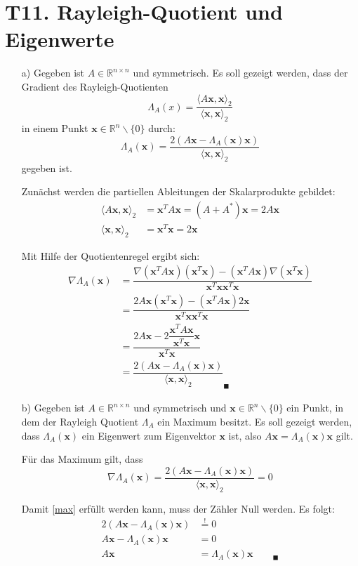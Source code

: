 \documentclass[11pt]{article}
\theoremstyle{plain}
\theoremstyle{definition}
\let\mbb\boldsymbol
\renewcommand\boldsymbol{\mbb}
\renewcommand{\a}{\"{a}}
\renewcommand{\u}{\"{u}}
\newcommand{\beequal}{\mathop{=}\limits^!}
\newcommand{\ray}{\Lambda_A(\mbb{x})}
\newcommand{\dray}{\nabla \Lambda_A(\mbb{x})}
\begin{document}
\section*{T11. Rayleigh-Quotient und Eigenwerte}
\begin{itemize}
\item[a)]
Gegeben ist $A \in \mathbb{R}^{n \times n}$ und symmetrisch. Es soll gezeigt werden, dass der Gradient des Rayleigh-Quotienten
\begin{equation}
\Lambda_A(x) = \frac{\langle A\mbb{x},\mbb{x}\rangle_2}{\langle \mbb{x},\mbb{x}\rangle_2} 
\end{equation}
in einem Punkt $\mbb{x}\in \mathbb{R}^n \backslash \{0\}$ durch:
\begin{equation}
\ray = \frac{2(A\mbb{x} - \ray \mbb{x})}{\langle \mbb{x},\mbb{x}\rangle_2}
\end{equation}
gegeben ist.

Zun\a chst werden die partiellen Ableitungen der Skalarprodukte gebildet:
\begin{align}
\langle A\mbb{x},\mbb{x}\rangle_2 &= \mbb{x}^TA\mbb{x}  = (A+A^*)\mbb{x} = 2A\mbb{x} \\
\langle \mbb{x},\mbb{x}\rangle_2 &= \mbb{x}^T\mbb{x} = 2\mbb{x} 
\end{align}

Mit Hilfe der Quotientenregel ergibt sich:
\begin{align}
\dray 
&= \dfrac{\nabla(\mbb{x}^TA\mbb{x}) (\mbb{x}^T\mbb{x}) - (\mbb{x}^TA\mbb{x}) \nabla(\mbb{x}^T\mbb{x})}{\mbb{x}^T\mbb{x}\mbb{x}^T\mbb{x}} \\
&= \dfrac{2A\mbb{x}(\mbb{x}^T\mbb{x}) - (\mbb{x}^TA\mbb{x})2\mbb{x} }{\mbb{x}^T\mbb{x}\mbb{x}^T\mbb{x}} \\
&= \dfrac{2A\mbb{x} - 2\dfrac{\mbb{x}^TA\mbb{x}}{\mbb{x}^T\mbb{x}}\mbb{x}}{\mbb{x}^T\mbb{x}} \\ 
&= \dfrac{2(A\mbb{x} - \ray \mbb{x})}{\langle \mbb{x},\mbb{x}\rangle_2} _\blacksquare
\end{align}

\item[b)]
Gegeben ist $A \in \mathbb{R}^{n \times n}$ und symmetrisch und $\mbb{x}\in \mathbb{R}^n \backslash \{0\}$ ein Punkt, in dem der Rayleigh Quotient $\Lambda_A$ ein Maximum besitzt. Es soll gezeigt werden, dass $\Lambda_A(\mbb{x})$ ein Eigenwert zum Eigenvektor $\mbb{x}$ ist, also $A\mbb{x} = \ray \mbb{x}$ gilt.

F\u r das Maximum gilt, dass
\begin{equation}
\dray = \frac{2(A\mbb{x} - \ray \mbb{x})}{\langle \mbb{x},\mbb{x}\rangle_2} = 0
\label{max}
\end{equation}

Damit \eqref{max} erf\u llt werden kann, muss der Z\a hler Null werden. Es folgt:
\begin{align}
2(A\mbb{x} - \ray \mbb{x}) &\beequal 0 \\
A\mbb{x} - \ray \mbb{x} &= 0\\
A\mbb{x} &= \ray \mbb{x} \qquad_\blacksquare
\end{align}

\end{itemize}
\end{document}
